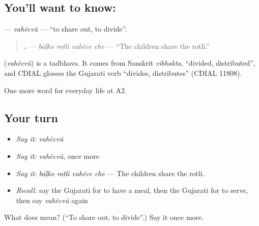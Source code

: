 \subsection*{You'll want to know: }
\textbf{} — \emph{vahẽcvũ} — \textquotedblleft{}to share out, to divide\textquotedblright{}.

\begin{quote}
\textbf{   .} — \emph{bāḷko roṭlī vahẽce che} — \textquotedblleft{}The children share the rotli.\textquotedblright{}
\end{quote}

\begin{cousinweb}
\textbf{} (\emph{vahẽcvũ}) is a tadbhava. It comes from Sanskrit \emph{vibhakta}, \textquotedblleft{}divided, distributed\textquotedblright{}, and CDIAL glosses the Gujarati verb \textquotedblleft{}divides, distributes\textquotedblright{} (CDIAL 11808).
\end{cousinweb}

\begin{grammarlens}[title={What you've built}]
One more word for everyday life at A2.
\end{grammarlens}

\subsection*{Your turn}
\begin{itemize}
\raggedright
  \item \emph{Say it:} \emph{vahẽcvũ}
  \item \emph{Say it:} \emph{vahẽcvũ}, once more
  \item \emph{Say it:} \emph{bāḷko roṭlī vahẽce che} — The children share the rotli.
  \item \emph{Recall:} say the Gujarati for to have a meal, then the Gujarati for to serve, then say \emph{vahẽcvũ} again
\end{itemize}

\begin{tcolorbox}[breakable,colback=teal!4,colframe=teal!35!black,title={Before you move on}]
What does  mean? (\textquotedblleft{}To share out, to divide\textquotedblright{}.) Say it once more.
\end{tcolorbox}
